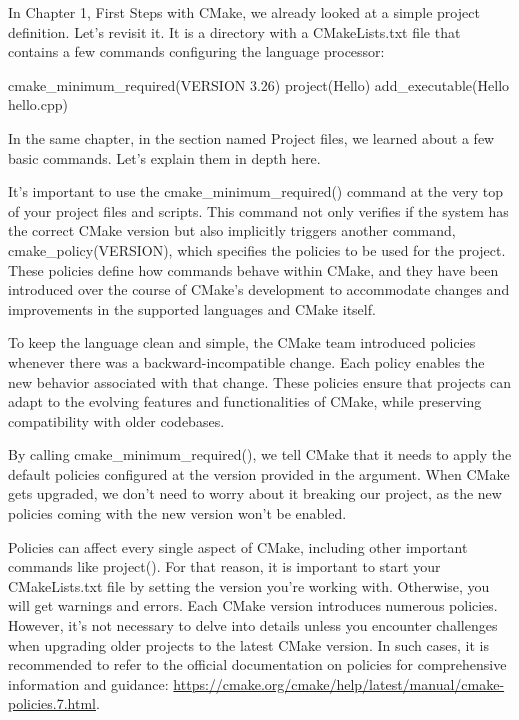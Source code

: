 In Chapter 1, First Steps with CMake, we already looked at a simple project definition. Let’s revisit it. It is a directory with a CMakeLists.txt file that contains a few commands configuring the language processor:


\begin{cmake}
cmake_minimum_required(VERSION 3.26)
project(Hello)
add_executable(Hello hello.cpp)
\end{cmake}

In the same chapter, in the section named Project files, we learned about a few basic commands. Let’s explain them in depth here.


It’s important to use the cmake\_minimum\_required() command at the very top of your project files and scripts. This command not only verifies if the system has the correct CMake version but also implicitly triggers another command, cmake\_policy(VERSION), which specifies the policies to be used for the project. These policies define how commands behave within CMake, and they have been introduced over the course of CMake’s development to accommodate changes and improvements in the supported languages and CMake itself.

To keep the language clean and simple, the CMake team introduced policies whenever there was a backward-incompatible change. Each policy enables the new behavior associated with that change. These policies ensure that projects can adapt to the evolving features and functionalities of CMake, while preserving compatibility with older codebases.

By calling cmake\_minimum\_required(), we tell CMake that it needs to apply the default policies configured at the version provided in the argument. When CMake gets upgraded, we don’t need to worry about it breaking our project, as the new policies coming with the new version won’t be enabled.

Policies can affect every single aspect of CMake, including other important commands like project(). For that reason, it is important to start your CMakeLists.txt file by setting the version you’re working with. Otherwise, you will get warnings and errors.
Each CMake version introduces numerous policies. However, it’s not necessary to delve into details unless you encounter challenges when upgrading older projects to the latest CMake version. In such cases, it is recommended to refer to the official documentation on policies for comprehensive information and guidance: \url{https://cmake.org/cmake/help/latest/manual/cmake-policies.7.html}.

